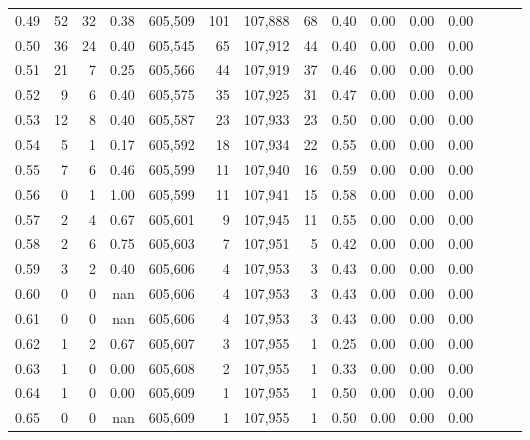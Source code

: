 \begin{tabular}{rrrrrrrrrrrrrrr}
0.49 &      52 &     32 &  0.38 &  605,509 &      101 &  107,888 &       68 &  0.40 &  0.00 &  0.00 &      0.00 \\
0.50 &      36 &     24 &  0.40 &  605,545 &       65 &  107,912 &       44 &  0.40 &  0.00 &  0.00 &      0.00 \\
0.51 &      21 &      7 &  0.25 &  605,566 &       44 &  107,919 &       37 &  0.46 &  0.00 &  0.00 &      0.00 \\
0.52 &       9 &      6 &  0.40 &  605,575 &       35 &  107,925 &       31 &  0.47 &  0.00 &  0.00 &      0.00 \\
0.53 &      12 &      8 &  0.40 &  605,587 &       23 &  107,933 &       23 &  0.50 &  0.00 &  0.00 &      0.00 \\
0.54 &       5 &      1 &  0.17 &  605,592 &       18 &  107,934 &       22 &  0.55 &  0.00 &  0.00 &      0.00 \\
0.55 &       7 &      6 &  0.46 &  605,599 &       11 &  107,940 &       16 &  0.59 &  0.00 &  0.00 &      0.00 \\
0.56 &       0 &      1 &  1.00 &  605,599 &       11 &  107,941 &       15 &  0.58 &  0.00 &  0.00 &      0.00 \\
0.57 &       2 &      4 &  0.67 &  605,601 &        9 &  107,945 &       11 &  0.55 &  0.00 &  0.00 &      0.00 \\
0.58 &       2 &      6 &  0.75 &  605,603 &        7 &  107,951 &        5 &  0.42 &  0.00 &  0.00 &      0.00 \\
0.59 &       3 &      2 &  0.40 &  605,606 &        4 &  107,953 &        3 &  0.43 &  0.00 &  0.00 &      0.00 \\
0.60 &       0 &      0 &   nan &  605,606 &        4 &  107,953 &        3 &  0.43 &  0.00 &  0.00 &      0.00 \\
0.61 &       0 &      0 &   nan &  605,606 &        4 &  107,953 &        3 &  0.43 &  0.00 &  0.00 &      0.00 \\
0.62 &       1 &      2 &  0.67 &  605,607 &        3 &  107,955 &        1 &  0.25 &  0.00 &  0.00 &      0.00 \\
0.63 &       1 &      0 &  0.00 &  605,608 &        2 &  107,955 &        1 &  0.33 &  0.00 &  0.00 &      0.00 \\
0.64 &       1 &      0 &  0.00 &  605,609 &        1 &  107,955 &        1 &  0.50 &  0.00 &  0.00 &      0.00 \\
0.65 &       0 &      0 &   nan &  605,609 &        1 &  107,955 &        1 &  0.50 &  0.00 &  0.00 &      0.00 \\

\end{tabular}
